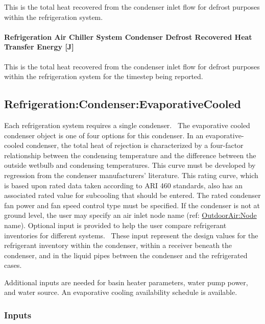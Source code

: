 This is the total heat recovered from the condenser inlet flow for defrost purposes within the refrigeration system.

\paragraph{Refrigeration Air Chiller System Condenser Defrost Recovered Heat Transfer Energy {[}J{]}}\label{refrigeration-air-chiller-system-condenser-defrost-recovered-heat-transfer-energy-j}

This is the total heat recovered from the condenser inlet flow for defrost purposes within the refrigeration system for the timestep being reported.

\subsection{Refrigeration:Condenser:EvaporativeCooled}\label{refrigerationcondenserevaporativecooled}

Each refrigeration system requires a single condenser.~ The evaporative cooled condenser object is one of four options for this condenser. In an evaporative-cooled condenser, the total heat of rejection is characterized by a four-factor relationship between the condensing temperature and the difference between the outside wetbulb and condensing temperatures. This curve must be developed by regression from the condenser manufacturers' literature. This rating curve, which is based upon rated data taken according to ARI 460 standards, also has an associated rated value for subcooling that should be entered. The rated condenser fan power and fan speed control type must be specified. If the condenser is not at ground level, the user may specify an air inlet node name (ref: \hyperref[outdoorairnode]{OutdoorAir:Node} name). Optional input is provided to help the user compare refrigerant inventories for different systems.~ These input represent the design values for the refrigerant inventory within the condenser, within a receiver beneath the condenser, and in the liquid pipes between the condenser and the refrigerated cases.

Additional inputs are needed for basin heater parameters, water pump power, and water source. An evaporative cooling availability schedule is available.

\subsubsection{Inputs}\label{inputs-9-016}

